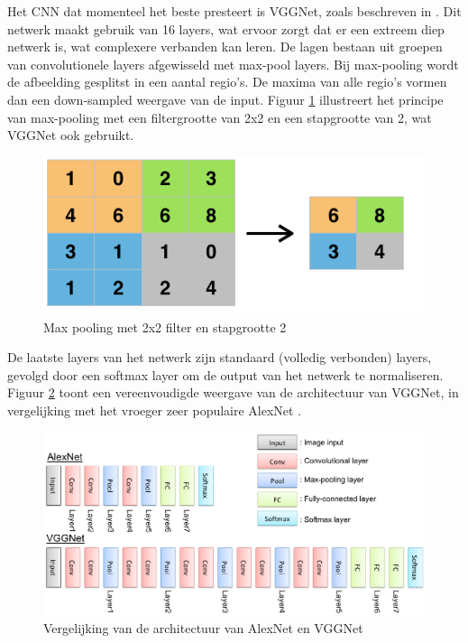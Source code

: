 Het CNN dat momenteel het beste presteert is VGGNet, zoals beschreven in . Dit netwerk maakt gebruik van 16 layers, wat ervoor zorgt dat er een extreem diep netwerk is, wat complexere verbanden kan leren. De lagen bestaan uit groepen van convolutionele layers afgewisseld met max-pool layers. Bij max-pooling wordt de afbeelding gesplitst in een aantal regio's. De maxima van alle regio's vormen dan een down-sampled weergave van de input. Figuur \ref{fig:maxpool}  illustreert het principe van max-pooling met een filtergrootte van 2x2 en een stapgrootte van 2, wat VGGNet ook gebruikt.

\begin{figure}[tb]
    \centering
    \includegraphics[width=0.6\linewidth]{Images/maxpool.png}
    \caption{Max pooling met 2x2 filter en stapgrootte 2}
    \label{fig:maxpool}
\end{figure}

De laatste layers van het netwerk zijn standaard (volledig verbonden) layers, gevolgd door een softmax layer om de output van het netwerk te normaliseren. Figuur \ref{fig:alexvgg} toont een vereenvoudigde weergave van de architectuur van VGGNet, in vergelijking met het vroeger zeer populaire AlexNet .

\begin{figure}[tb]
    \centering
    \includegraphics[width=\linewidth]{Images/alex_vgg.eps}
    \caption{Vergelijking van de architectuur van AlexNet en VGGNet}
    \label{fig:alexvgg}
\end{figure}



